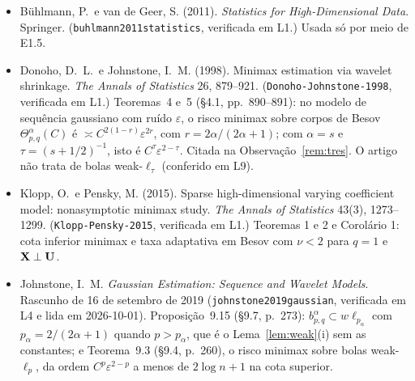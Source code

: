 \documentclass[11pt,a4paper]{article}
\begin{document}
\begin{itemize}[nosep, leftmargin=*]
  \item Bühlmann, P.\ e van de Geer, S. (2011). \emph{Statistics for
    High-Dimensional Data}. Springer. (\texttt{buhlmann2011statistics},
    verificada em L1.) Usada só por meio de E1.5.
  \item Donoho, D.~L.\ e Johnstone, I.~M. (1998). Minimax estimation via
    wavelet shrinkage. \emph{The Annals of Statistics} 26, 879--921.
    (\texttt{Donoho-Johnstone-1998}, verificada em L1.) Teoremas~4 e~5
    (\S4.1, pp.~890--891): no modelo de sequência gaussiano com ruído
    $\varepsilon$, o risco minimax sobre corpos de Besov
    $\Theta^{\alpha}_{p,q}(C)$ é $\asymp C^{2(1-r)}\varepsilon^{2r}$, com
    $r = 2\alpha/(2\alpha+1)$; com $\alpha = s$ e $\tau = (s+1/2)^{-1}$,
    isto é $C^{\tau}\varepsilon^{2-\tau}$. Citada na
    Observação~\ref{rem:tres}. O artigo não trata de bolas
    weak-$\ell_{\tau}$ (conferido em L9).
  \item Klopp, O.\ e Pensky, M. (2015). Sparse high-dimensional varying
    coefficient model: nonasymptotic minimax study. \emph{The Annals of
    Statistics} 43(3), 1273--1299. (\texttt{Klopp-Pensky-2015}, verificada em
    L1.) Teoremas 1 e 2 e Corolário 1: cota inferior minimax e taxa adaptativa
    em Besov com $\nu < 2$ para $q = 1$ e $\mathbf{X} \perp \mathbf{U}$.
  \item Johnstone, I.~M. \emph{Gaussian Estimation: Sequence and Wavelet
    Models}. Rascunho de 16 de setembro de 2019
    (\texttt{johnstone2019gaussian}, verificada em L4 e lida em
    2026-10-01). Proposição~9.15 (\S9.7, p.~273): $b^{\alpha}_{p,q} \subset
    w\ell_{p_\alpha}$ com $p_\alpha = 2/(2\alpha+1)$ quando $p > p_\alpha$,
    que é o Lema~\ref{lem:weak}(i) sem as constantes; e Teorema~9.3
    (\S9.4, p.~260), o risco minimax sobre bolas weak-$\ell_p$, da ordem
    $C^{p}\varepsilon^{2-p}$ a menos de $2\log n + 1$ na cota superior.
\end{itemize}
\end{document}
